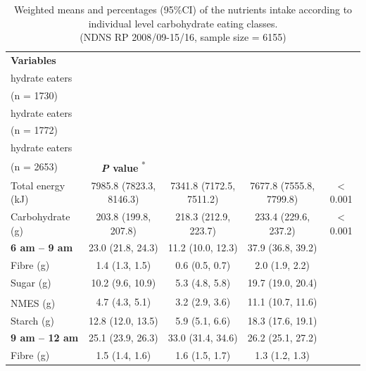 \begin{table}[H]
	
	\caption{\label{tab:tab-nutri-indi}Weighted means and percentages (95\%CI) of the nutrients intake according to individual level carbohydrate eating classes.  \\ (NDNS RP 2008/09-15/16, sample size = 6155)}\vspace{-0.3cm}
	\centering
	\fontsize{9}{11}\selectfont
	\begin{tabular}[t]{lcccc}
		\hiderowcolors
		\toprule
	\textbf{Variables} & \textbf{\Centerstack{Low carbo-\\hydrate eaters\\(n = 1730)}} & \textbf{\Centerstack{Moderate carbo-\\hydrate eaters\\(n = 1772)}} & \textbf{\Centerstack{High carbo-\\hydrate eaters\\(n = 2653)}} & \textbf{\textit{P} value} \textsuperscript{*}\\
		\midrule
		\showrowcolors
		Total energy (kJ) & 7985.8 (7823.3, 8146.3) & 7341.8 (7172.5, 7511.2) & 7677.8 (7555.8, 7799.8) & < 0.001\\
		Carbohydrate (g) & 203.8 (199.8, 207.8) & 218.3 (212.9, 223.7) & 233.4 (229.6, 237.2) & < 0.001\\
		\hspace{1em}\textbf{6 am – 9 am} & 23.0 (21.8,  24.3) & 11.2 (10.0, 12.3) & 37.9 (36.8, 39.2) & \\
		\hspace{2em}Fibre (g) & 1.4 (1.3, 1.5) & 0.6 (0.5, 0.7) & 2.0 (1.9, 2.2) & \\
		\hspace{2em}Sugar (g) & 10.2 (9.6, 10.9) & 5.3 (4.8, 5.8) & 19.7 (19.0, 20.4) & \\
		\hspace{3em}NMES (g)\textsuperscript{\dag} & 4.7 (4.3, 5.1) & 3.2 (2.9, 3.6) & 11.1 (10.7, 11.6) & \\
		\hspace{2em}Starch (g) & 12.8 (12.0, 13.5) & 5.9 (5.1, 6.6) & 18.3 (17.6, 19.1) & \\
		\hspace{1em}\textbf{9 am – 12 am} & 25.1 (23.9, 26.3) & 33.0 (31.4, 34.6) & 26.2 (25.1, 27.2) & \\
		\hspace{2em}Fibre (g) & 1.5 (1.4, 1.6) & 1.6 (1.5, 1.7) & 1.3 (1.2, 1.3) & \\

\end{tabular}
\end{table}
